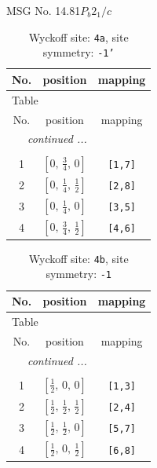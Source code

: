 \documentclass[fleqn,8pt]{jsarticle}
\begin{document}
\setcounter{MaxMatrixCols}{32}

\renewcommand{\tablename}{Table~}
\renewcommand{\figurename}{Figure~}
\begin{center}
\LARGE
MSG No. 14.81\quad$P_{b}2_{1}/c$
\end{center}
\renewcommand{\arraystretch}{1.2}
\begin{longtable}{ccc}
\caption{Wyckoff site: {\tt 4a}, site symmetry: {\tt -1'}}
 \\
 \hline \hline
No. & position & mapping \\ \hline \endfirsthead

\multicolumn{2}{l}{\tablename\ \thetable{}} \\
 \hline \hline
No. & position & mapping \\ \hline \endhead

 \hline \hline
\multicolumn{2}{r}{\footnotesize\it continued ...} \\ \endfoot

 \hline \hline
\multicolumn{2}{r}{} \\ \endlastfoot

1 & $\left[ 0,\, \frac{3}{4},\, 0 \right]$ & {\tt [1,7]} \\ \hline
2 & $\left[ 0,\, \frac{1}{4},\, \frac{1}{2} \right]$ & {\tt [2,8]} \\ \hline
3 & $\left[ 0,\, \frac{1}{4},\, 0 \right]$ & {\tt [3,5]} \\ \hline
4 & $\left[ 0,\, \frac{3}{4},\, \frac{1}{2} \right]$ & {\tt [4,6]} \\
\end{longtable}
\renewcommand{\arraystretch}{1.2}
\begin{longtable}{ccc}
\caption{Wyckoff site: {\tt 4b}, site symmetry: {\tt -1}}
 \\
 \hline \hline
No. & position & mapping \\ \hline \endfirsthead

\multicolumn{2}{l}{\tablename\ \thetable{}} \\
 \hline \hline
No. & position & mapping \\ \hline \endhead

 \hline \hline
\multicolumn{2}{r}{\footnotesize\it continued ...} \\ \endfoot

 \hline \hline
\multicolumn{2}{r}{} \\ \endlastfoot

1 & $\left[ \frac{1}{2},\, 0,\, 0 \right]$ & {\tt [1,3]} \\ \hline
2 & $\left[ \frac{1}{2},\, \frac{1}{2},\, \frac{1}{2} \right]$ & {\tt [2,4]} \\ \hline
3 & $\left[ \frac{1}{2},\, \frac{1}{2},\, 0 \right]$ & {\tt [5,7]} \\ \hline
4 & $\left[ \frac{1}{2},\, 0,\, \frac{1}{2} \right]$ & {\tt [6,8]} \\
\end{longtable}
\end{document}
